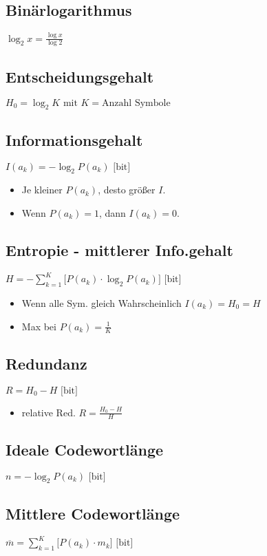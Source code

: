 \subsection*{Binärlogarithmus}
$\displaystyle \log_2{x} = \frac{\log{x}}{\log{2}}$

\subsection*{Entscheidungsgehalt}
$\displaystyle H_0 = \log_2{K} \mbox{ mit } K = \text{Anzahl Symbole}$

\subsection*{Informationsgehalt}
\begin{minipage}{\columnwidth}
$\displaystyle I(a_k) = -\log_2{P(a_k)} \mbox{  [bit]}$
\begin{itemize}
	\setlength{\parskip}{0pt}
	\setlength{\itemsep}{0pt}
	\item Je kleiner $P(a_k)$, desto größer $I$.
	\item Wenn $P(a_k) = 1$, dann $I(a_k) = 0$.
\end{itemize}
\end{minipage}

\subsection*{Entropie - mittlerer Info.gehalt}
\begin{minipage}{\columnwidth}
$\displaystyle H = - \sum_{k=1}^{K} \bigg[ P(a_k) \cdot \log_2{P(a_k)} \bigg] \mbox{  [bit]}$
\begin{itemize}
	\setlength{\parskip}{0pt}
	\setlength{\itemsep}{0pt plus 1pt}
	\item Wenn alle Sym. gleich Wahrscheinlich $I(a_k) = H_0 = H$
	\item Max bei $P(a_k) = \frac{1}{K}$
\end{itemize}
\end{minipage}

\subsection*{Redundanz}
\begin{minipage}{\columnwidth}
$\displaystyle R = H_0 - H \mbox{  [bit]}$
\begin{itemize}
	\setlength{\parskip}{0pt}
	\setlength{\itemsep}{0pt plus 1pt}
	\item relative Red. $\displaystyle R = \frac{H_0 - H}{H}$
\end{itemize}
\end{minipage}

\subsection*{Ideale Codewortlänge}
$\displaystyle n = -\log_2{P(a_k)} \mbox{  [bit]}$

\subsection*{Mittlere Codewortlänge}
$\displaystyle \overline{m} = \sum_{k=1}^{K} \bigg[ P(a_k) \cdot m_k \bigg] \mbox{  [bit]}$